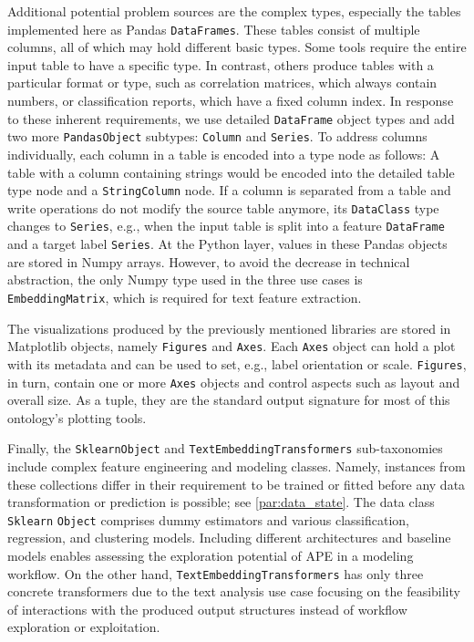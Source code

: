 Additional potential problem sources are the complex types, especially the tables implemented here as Pandas \texttt{DataFrames}. These tables consist of multiple columns, all of which may hold different basic types. Some tools require the entire input table to have a specific type. In contrast, others produce tables with a particular format or type, such as correlation matrices, which always contain numbers, or classification reports, which have a fixed column index. In response to these inherent requirements, we use detailed \texttt{DataFrame} object types and add two more \texttt{PandasObject} subtypes: \texttt{Column} and \texttt{Series}. To address columns individually, each column in a table is encoded into a type node as follows: A table with a column containing strings would be encoded into the detailed table type node and a \texttt{StringColumn} node. If a column is separated from a table and write operations do not modify the source table anymore, its \texttt{DataClass} type changes to \texttt{Series}, e.g., when the input table is split into a feature \texttt{DataFrame} and a target label \texttt{Series}. At the Python layer, values in these Pandas objects are stored in Numpy arrays. However, to avoid the decrease in technical abstraction, the only Numpy type used in the three use cases is \texttt{EmbeddingMatrix}, which is required for text feature extraction.

The visualizations produced by the previously mentioned libraries are stored in Matplotlib objects, namely \texttt{Figures} and \texttt{Axes}. Each \texttt{Axes} object can hold a plot with its metadata and can be used to set, e.g., label orientation or scale. \texttt{Figures}, in turn, contain one or more \texttt{Axes} objects and control aspects such as layout and overall size. As a tuple, they are the standard output signature for most of this ontology’s plotting tools.

Finally, the \verb|SklearnObject| and \verb|TextEmbeddingTransformers| sub-taxonomies include complex feature engineering and modeling classes. Namely, instances from these collections differ in their requirement to be trained or fitted before any data transformation or prediction is possible; see \autoref{par:data_state}. The data class \verb|Sklearn| \verb|Object| comprises dummy estimators and various classification, regression, and clustering models. Including different architectures and baseline models enables assessing the exploration potential of APE in a modeling workflow. On the other hand, \verb|TextEmbeddingTransformers| has only three concrete transformers due to the text analysis use case focusing on the feasibility of interactions with the produced output structures instead of workflow exploration or exploitation.

